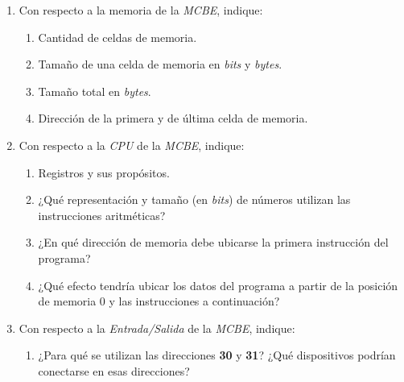 \documentclass[12pt]{article}
\begin{document}
\begin{enumerate}

    \item Con respecto a la memoria de la \emph{MCBE}, indique:

        \begin{enumerate}

            \item Cantidad de celdas de memoria.

            \item Tamaño de una celda de memoria en \emph{bits}
                y \emph{bytes}.

            \item Tamaño total en \emph{bytes}.

            \item Dirección de la primera y de última celda de memoria.

        \end{enumerate}

    \item Con respecto a la \emph{CPU} de la \emph{MCBE}, indique:

        \begin{enumerate}

            \item Registros y sus propósitos.

            \item ¿Qué representación y tamaño (en \emph{bits}) de números
                utilizan las instrucciones aritméticas?

            \item ¿En qué dirección de memoria debe ubicarse la primera
                instrucción del programa?

            \item ¿Qué efecto tendría ubicar los datos del programa a partir
                de la posición de memoria 0 y las instrucciones a
                continuación?

        \end{enumerate}

    \item Con respecto a la \emph{Entrada/Salida} de la \emph{MCBE}, indique:

        \begin{enumerate}

            \item ¿Para qué se utilizan las direcciones \textbf{30} y
                \textbf{31}? ¿Qué dispositivos podrían conectarse en esas
                direcciones?


\end{enumerate}
\end{enumerate}
\end{document}

